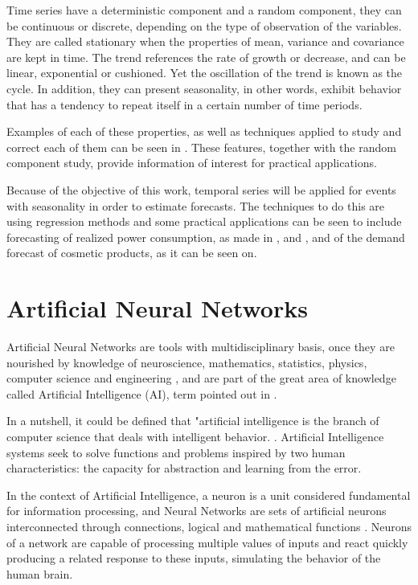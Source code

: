             Time series have a deterministic component and a random component, they can be continuous or discrete, depending on the type of observation of the variables. They are called stationary when the properties of mean, variance and covariance are kept in time. The trend references the rate of growth or decrease, and can be linear, exponential or cushioned. Yet the oscillation of the trend is known as the cycle. In addition, they can present seasonality, in other words, exhibit behavior that has a tendency to repeat itself in a certain number of time periods.
    
             Examples of each of these properties, as well as techniques applied to study and correct each of them can be seen in \cite{tecnicas1}. These features, together with the random component study, provide information of interest for practical applications.
             
            Because of the objective of this work, temporal series will be applied for events with seasonality in order to estimate forecasts. The techniques to do this are using regression methods and some practical applications can be seen to include forecasting of realized power consumption, as made in ,  and , and of the demand forecast of cosmetic products, as it can be seen on.
    
    \section{Artificial Neural Networks}
    
        Artificial Neural Networks are tools with multidisciplinary basis, once they are nourished by knowledge of neuroscience, mathematics, statistics, physics, computer science and engineering \cite{Haykin1994}, and are part of the great area of knowledge called Artificial Intelligence (AI), term pointed out in \cite{kaplan2019siri}.
        
        In a nutshell, it could be defined that "artificial intelligence is the branch of computer science that deals with intelligent behavior. \cite{Luger2004}. Artificial Intelligence systems seek to solve functions and problems inspired by two human characteristics: the capacity for abstraction and learning from the error.
        
        In the context of Artificial Intelligence, a neuron is a unit considered fundamental for information processing, and Neural Networks are sets of artificial neurons interconnected through connections, logical and mathematical functions \cite{Haykin1994}. Neurons of a network are capable of processing multiple values of inputs and react quickly producing a related response to these inputs, simulating the behavior of the human brain. 
        
